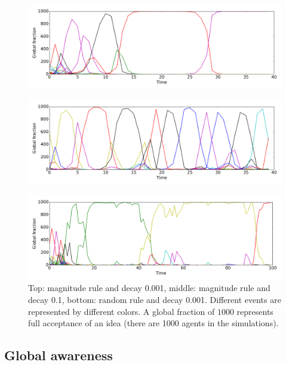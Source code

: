 \documentclass [12pt,a4paper,twoside]{article}
\begin{document}
\begin{figure}[H]
\includegraphics[scale=0.4]{report/event_histories/time_evolution_r1_decay0001_short}

\end{figure}
\begin{figure}[h!]
\includegraphics[scale=0.4]{report/event_histories/time_evolution_r1_decay0100_short}
\end{figure}
\begin{figure}[h!]
\includegraphics[scale=0.4]{report/event_histories/time_evolution_r2_decay0001}
\caption{Top: magnitude rule and decay 0.001, middle: magnitude rule and decay 0.1, bottom: random rule and decay 0.001. Different events are represented by different colors. A global fraction of $1000$ represents full acceptance of an idea (there are 1000 agents in the simulations).}
\label{event_history}
\end{figure}

\subsection{Global awareness}
\end{document}
